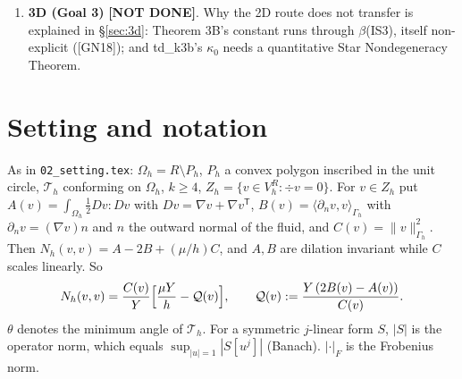 \documentclass[11pt]{article}
\theoremstyle{remark}\newtheorem{remark}[theorem]{Remark}
\newcommand{\Oh}{\Omega_h}\newcommand{\Gh}{\Gamma_h}\newcommand{\hG}{h_\Gamma}\newcommand{\dn}{\partial_n}
\newcommand{\norm}[1]{\|#1\|}\newcommand{\ip}[2]{\langle #1,#2\rangle}\DeclareMathOperator{\curl}{curl}\DeclareMathOperator{\diam}{diam}
\newcommand{\lab}[1]{\textbf{[#1]}}
\newcommand{\Th}{\mathcal T_h}\newcommand{\Zh}{Z_h}\newcommand{\VR}{V_h^R}\newcommand{\EG}{\mathcal E_\Gamma}
\begin{document}
\begin{enumerate}[label=(\arabic*)]
\begin{itemize}
    gives the \emph{upper} bound $\diam T\le C(\theta)(|e|+\operatorname{dist}(T,x_0))$ with $C(\theta)\ge1$, and that
    growth is attained. On a dyadically graded boundary layer (min angle $26.57^\circ$, (M0)--(M2)) \emph{every} ball
    $B(x_0,3Y)$, $x_0\in\Gh$, $Y>0$, contains a triangle of diameter $\ge Y$. So the hypothesis fails for every $\kappa<1$ at
    every scale, and Theorem~\ref{thm:Aexp} (any version with $\kappa_0<1$) never applies there.
  \item \lab{NUMERICAL} Nevertheless the \emph{same witness} works on such meshes. On the dyadic layer (ratio $2$ per layer) and
    a triadic one (ratio $3$, min angle $15.3^\circ$), $Y(2B-A)/C=15.28$ and $15.24$ at $Y=2\hG$, and $\to15.487$ as
    $Y/\hG$ grows. So on those meshes $\mu^\ast\ge7.6\,h/\hG$. The obstruction is to the proof (interpolation constants on
    coarse cells), not to the conclusion.
  \item Status: general (M0)--(M2) remains \lab{OPEN}, exactly as in the penalty report (Theorem~B there). The explicit
    theorem needs about $3C_q/\kappa_0\approx250$--$800$ quasi-uniform layers; the numerics suggest $2$--$3$.
  \end{itemize}
\item \textbf{3D (Goal 3)} \lab{NOT DONE}. Why the 2D route does not transfer is explained in \S\ref{sec:3d}: Theorem 3B's
  constant runs through $\beta$(IS3), itself non-explicit ([GN18]); and td\_k3b's $\kappa_0$ needs a quantitative Star
  Nondegeneracy Theorem.
\end{enumerate}

\section{Setting and notation}
As in \texttt{02\_setting.tex}: $\Oh=R\setminus P_h$, $P_h$ a convex polygon inscribed in the unit circle, $\Th$ conforming
on $\Oh$, $k\ge4$, $\Zh=\{v\in\VR:\div v=0\}$. For $v\in\Zh$ put $A(v)=\int_{\Oh}\tfrac12 Dv:Dv$ with $Dv=\nabla v+\nabla v^{\mathsf T}$,
$B(v)=\ip{\dn v}{v}_{\Gh}$ with $\dn v=(\nabla v)n$ and $n$ the outward normal of the fluid, and $C(v)=\norm v^2_{\Gh}$. Then
$N_h(v,v)=A-2B+(\mu/h)C$, and $A,B$ are dilation invariant while $C$ scales linearly. So
\[N_h(v,v)=\frac{C(v)}{Y}\Bigl[\frac{\mu Y}{h}-\mathcal Q(v)\Bigr],\qquad \mathcal Q(v):=\frac{Y\,(2B(v)-A(v))}{C(v)} .\]
$\theta$ denotes the minimum angle of $\Th$. For a symmetric $j$-linear form $S$, $|S|$ is the operator norm, which equals
$\sup_{|u|=1}|S[u^j]|$ (Banach). $|\cdot|_F$ is the Frobenius norm.
\end{document}
